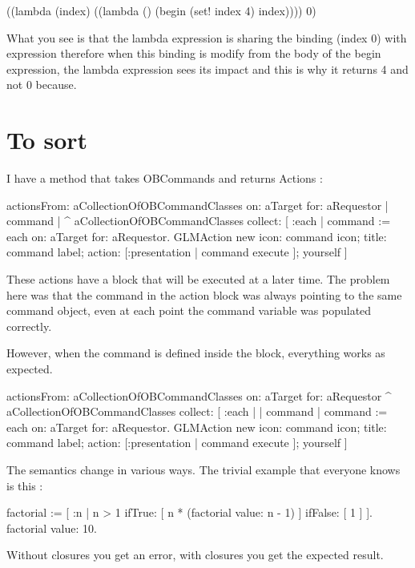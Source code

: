\documentclass[a4paper,10pt,twoside]{book}
\begin{document}
\begin{code}{}
((lambda (index)
   ((lambda () (begin 
                (set! index 4)
                index))))
 0)
\end{code}


What you see is that the lambda expression is sharing the binding (index 0) with expression 
therefore when this binding is modify from the body of the begin expression, the lambda expression sees its impact
and this is why it returns 4 and not 0 because. 


\section{To sort}




I have a method that takes OBCommands and returns Actions :

\begin{code}{}
actionsFrom: aCollectionOfOBCommandClasses on: aTarget for: aRequestor
	| command |
	^ aCollectionOfOBCommandClasses collect: [ :each |
		command := each on: aTarget for: aRequestor.
		GLMAction new
			icon: command icon;
			title: command label;
			action: [:presentation | command execute ];
			yourself
		]
	\end{code}

These actions have a block that will be executed at a later time. The  
problem here was that the command in the action block was always  
pointing to the same command object, even at each point the command  
variable was populated correctly. 

However, when the command is defined inside the block, everything  
works as expected.

\begin{code}{}
actionsFrom: aCollectionOfOBCommandClasses on: aTarget for: aRequestor
	^ aCollectionOfOBCommandClasses collect: [ :each |
		| command |
		command := each on: aTarget for: aRequestor.
		GLMAction new
			icon: command icon;
			title: command label;
			action: [:presentation | command execute ];
			yourself
		]
	\end{code}




The semantics change in various ways. The trivial example that everyone 
knows is this :
\begin{code}{}
factorial := [ :n |
	n > 1
		ifTrue: [ n * (factorial value: n - 1) ]
		ifFalse: [ 1 ] ].
factorial value: 10.
\end{code}
Without closures you get an error, with closures you get the expected 
result. 
\end{document}
